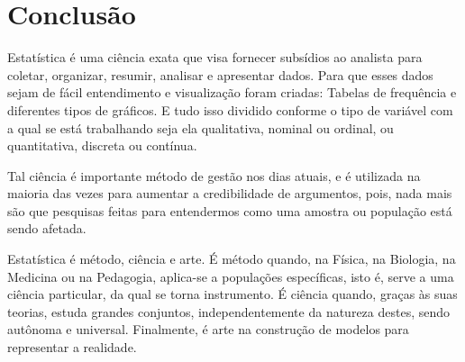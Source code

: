 \documentclass[
	12pt,				%
	oneside,			%
	a4paper,			%
	english,			%
	french,				%
	spanish,			%
	brazil,				%
	]{abntex2}
\begin{document}




\newpage
\section[Conclusão]{Conclusão}
\pagestyle{fancy}

Estatística é uma ciência exata que visa fornecer subsídios ao analista para coletar, organizar, resumir, analisar e apresentar dados.\cite{mat} Para que esses dados sejam de fácil entendimento e visualização foram criadas: Tabelas de frequência e diferentes tipos de gráficos. E tudo isso dividido conforme o tipo de variável com a qual se está trabalhando seja ela qualitativa, nominal ou ordinal, ou quantitativa, discreta ou contínua.

Tal ciência é importante método de gestão nos dias atuais, e é utilizada na maioria das vezes para aumentar a credibilidade de argumentos, pois, nada mais são que pesquisas feitas para entendermos como uma amostra ou população está sendo afetada.\cite{conc1}

Estatística é método, ciência e arte. É método quando, na Física, na Biologia, na Medicina ou na Pedagogia, aplica-se a populações específicas, isto é, serve a uma ciência particular, da qual se torna instrumento. É ciência quando, graças às suas teorias, estuda grandes conjuntos, independentemente da natureza destes, sendo autônoma e universal. Finalmente, é arte na construção de modelos para representar a realidade.\cite{conc}


%
%



\end{document}
